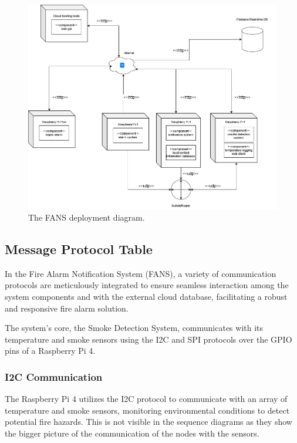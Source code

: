 \begin{figure}[H]
    \centering
    \includegraphics[width=\imagewidth]{../assets/FANSDeployment.png}
    \caption{The FANS deployment diagram.}
    \label{fig:deployment}
\end{figure}

\subsection{Message Protocol Table}

In the Fire Alarm Notification System (FANS), a variety of communication protocols are meticulously integrated to
ensure seamless interaction among the system components and with the external cloud database, facilitating a robust and
responsive fire alarm solution.

The system’s core, the Smoke Detection System, communicates with its temperature and smoke sensors using the I2C and
SPI protocols over the GPIO pins of a Raspberry Pi 4.

\subsubsection{I2C Communication}

The Raspberry Pi 4 utilizes the I2C protocol to communicate with an array of temperature and smoke sensors, monitoring
environmental conditions to detect potential fire hazards. This is not visible in the sequence diagrams as they show
the bigger picture of the communication of the nodes with the sensors.

